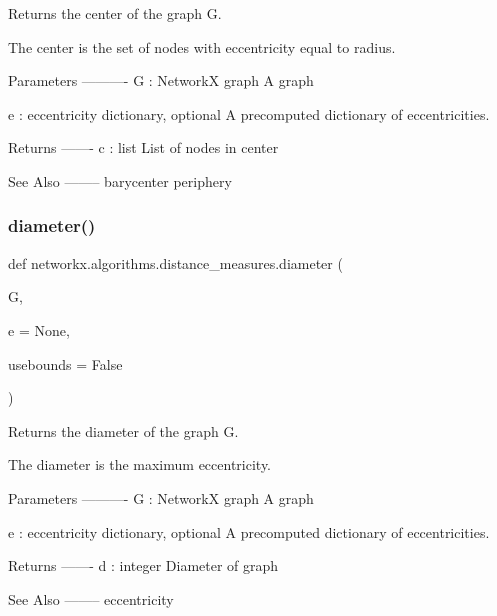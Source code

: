 \begin{DoxyVerb}Returns the center of the graph G.

The center is the set of nodes with eccentricity equal to radius.

Parameters
----------
G : NetworkX graph
   A graph

e : eccentricity dictionary, optional
  A precomputed dictionary of eccentricities.

Returns
-------
c : list
   List of nodes in center

See Also
--------
barycenter
periphery
\end{DoxyVerb}
 \mbox{\label{namespacenetworkx_1_1algorithms_1_1distance__measures_a1fbf5089b3e4894da24660e947bdbcfb}} 
\subsubsection{\texorpdfstring{diameter()}{diameter()}}
{\footnotesize\ttfamily def networkx.\+algorithms.\+distance\+\_\+measures.\+diameter (\begin{DoxyParamCaption}\item[{}]{G,  }\item[{}]{e = {\ttfamily None},  }\item[{}]{usebounds = {\ttfamily False} }\end{DoxyParamCaption})}

\begin{DoxyVerb}Returns the diameter of the graph G.

The diameter is the maximum eccentricity.

Parameters
----------
G : NetworkX graph
   A graph

e : eccentricity dictionary, optional
  A precomputed dictionary of eccentricities.

Returns
-------
d : integer
   Diameter of graph

See Also
--------
eccentricity
\end{DoxyVerb}
 \mbox{\label{namespacenetworkx_1_1algorithms_1_1distance__measures_aa09822182da9f014bc660e3bfe00f8a7}} 
